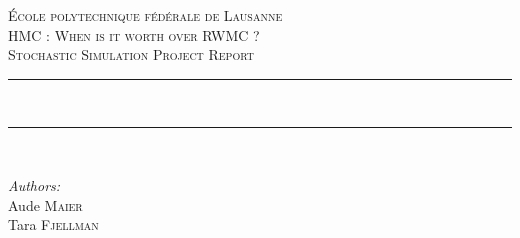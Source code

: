 \begin{titlepage}
    \newcommand{\HRule}{\rule{\linewidth}{0.5mm}} %
    
    \center  %
     

    \vspace{3cm}
    \textsc{\LARGE École polytechnique fédérale de Lausanne}\\[1.5cm] %
    
    \textsc{\Large HMC : When is it worth over RWMC ?}\\[0.5cm] %
    \textsc{\large Stochastic Simulation Project Report}\\[0.5cm] %
    
    
    \HRule \\[0.4cm] %
    
    
    
    \HRule \\[1.5cm]
     
    
    \begin{minipage}{0.4\textwidth}
    \begin{flushleft} \large
    
    \emph{Authors:}\\
    Aude \textsc{Maier}\\
    Tara \textsc{Fjellman}\\    
    
    \end{flushleft}
    \end{minipage}
    ~
    \begin{minipage}{0.4\textwidth}
    \begin{flushright} \large
    

\end{flushright}
\end{minipage}
\end{titlepage}
